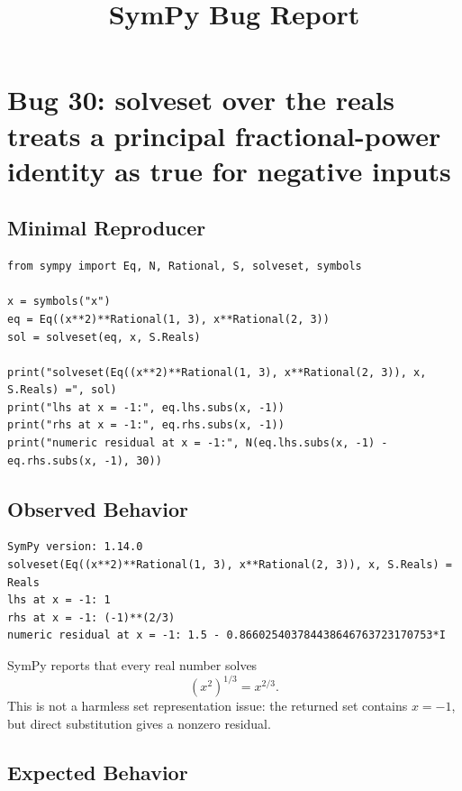 \documentclass[11pt]{article}
\title{SymPy Bug Report}
\author{}
\date{}
\begin{document}
\maketitle

\section{Bug 30: solveset over the reals treats a principal fractional-power identity as true for negative inputs}

\subsection{Minimal Reproducer}

\medskip

\begin{lstlisting}[style=bugpython]
from sympy import Eq, N, Rational, S, solveset, symbols

x = symbols("x")
eq = Eq((x**2)**Rational(1, 3), x**Rational(2, 3))
sol = solveset(eq, x, S.Reals)

print("solveset(Eq((x**2)**Rational(1, 3), x**Rational(2, 3)), x, S.Reals) =", sol)
print("lhs at x = -1:", eq.lhs.subs(x, -1))
print("rhs at x = -1:", eq.rhs.subs(x, -1))
print("numeric residual at x = -1:", N(eq.lhs.subs(x, -1) - eq.rhs.subs(x, -1), 30))
\end{lstlisting}

\subsection{Observed Behavior}

\medskip

\begin{lstlisting}[style=bugpython]
SymPy version: 1.14.0
solveset(Eq((x**2)**Rational(1, 3), x**Rational(2, 3)), x, S.Reals) = Reals
lhs at x = -1: 1
rhs at x = -1: (-1)**(2/3)
numeric residual at x = -1: 1.5 - 0.866025403784438646763723170753*I
\end{lstlisting}

SymPy reports that every real number solves
\[
  (x^2)^{1/3}=x^{2/3}.
\]
This is not a harmless set representation issue: the returned set contains \(x=-1\), but direct substitution gives a nonzero residual.

\subsection{Expected Behavior}
\end{document}
